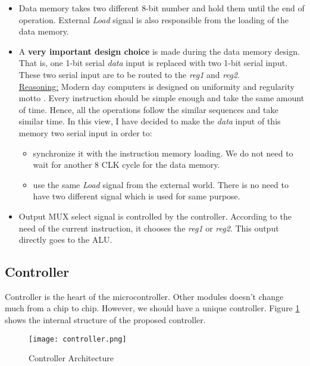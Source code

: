 \documentclass[12pt]{article}
\begin{document}
\begin{itemize}
\item Data memory takes two different 8-bit number and hold them until the end of operation. External \textsl{Load} signal is also responsible from the loading of the data memory.

\item A \textbf{very important design choice} is made during the  data memory design. That is, one 1-bit serial \textsl{data} input is replaced with two 1-bit serial input. These two serial input are to be routed to the \textsl{reg1} and \textsl{reg2}.\\
\underline{Reasoning:} Modern day computers is designed on uniformity and regularity motto \cite{b2}. Every instruction should be simple enough and take the same amount of time. Hence, all the operations follow the similar sequences and take similar time. In this view, I have decided to make the \textsl{data} input of this memory two serial input in order to:
\begin{itemize}
\item synchronize it with the instruction memory loading. We do not need to wait for another 8 CLK cycle for the data memory.
\item use the same \textsl{Load} signal from the external world. There is no need to have two different signal which is used for same purpose.
\end{itemize}


\item Output MUX select signal is controlled by the controller. According to the need of the current instruction, it chooses the \textsl{reg1} or \textsl{reg2}. This output directly goes to the ALU.
\end{itemize}


\subsection*{Controller}

Controller is the heart of the microcontroller. Other modules doesn't change much from a chip to chip. However, we should have a unique controller. Figure \ref{controller} shows the internal structure of the proposed controller.

\begin{figure}[H]
\centering
\texttt{[image: controller.png]}
\caption{Controller Architecture}
\label{controller}
\end{figure}
\end{document}
